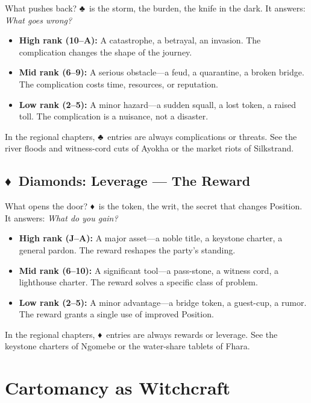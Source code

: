 \documentclass[12pt,oneside]{book}
\renewcommand{\clubsuit}{♣}
\renewcommand{\diamondsuit}{♦}
\begin{document}
What pushes back? \clubsuit\ is the storm, the burden, the knife in the dark. It answers: \textit{What goes wrong?}

\begin{itemize}
    \item \textbf{High rank (10--A):} A catastrophe, a betrayal, an invasion. The complication changes the shape of the journey.
    \item \textbf{Mid rank (6--9):} A serious obstacle---a feud, a quarantine, a broken bridge. The complication costs time, resources, or reputation.
    \item \textbf{Low rank (2--5):} A minor hazard---a sudden squall, a lost token, a raised toll. The complication is a nuisance, not a disaster.
\end{itemize}

In the regional chapters, \clubsuit\ entries are always complications or threats. See the river floods and witness-cord cuts of Ayokha or the market riots of Silkstrand.

\subsection*{\diamondsuit\ Diamonds: Leverage --- The Reward}

What opens the door? \diamondsuit\ is the token, the writ, the secret that changes Position. It answers: \textit{What do you gain?}

\begin{itemize}
    \item \textbf{High rank (J--A):} A major asset---a noble title, a keystone charter, a general pardon. The reward reshapes the party's standing.
    \item \textbf{Mid rank (6--10):} A significant tool---a pass-stone, a witness cord, a lighthouse charter. The reward solves a specific class of problem.
    \item \textbf{Low rank (2--5):} A minor advantage---a bridge token, a guest-cup, a rumor. The reward grants a single use of improved Position.
\end{itemize}

In the regional chapters, \diamondsuit\ entries are always rewards or leverage. See the keystone charters of Ngomebe or the water-share tablets of Fhara.

\section*{Cartomancy as Witchcraft}
\end{document}
